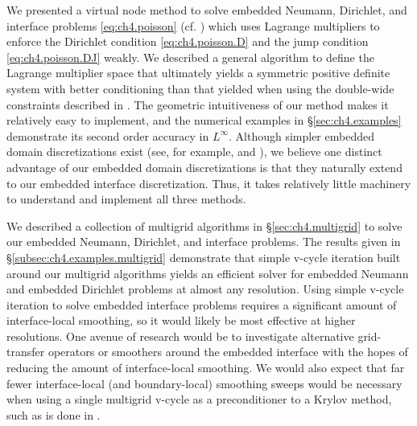 We presented a virtual node method to solve embedded Neumann, Dirichlet, and interface problems \eqref{eq:ch4.poisson} (cf. \cite{Bedrossian10}) which uses Lagrange multipliers to enforce the Dirichlet condition \eqref{eq:ch4.poisson.D} and the jump condition \eqref{eq:ch4.poisson.DJ} weakly. We described a general algorithm to define the Lagrange multiplier space that ultimately yields a symmetric positive definite system with better conditioning than that yielded when using the double-wide constraints described in \cite{Bedrossian10}. The geometric intuitiveness of our method makes it relatively easy to implement, and the numerical examples in \S\ref{sec:ch4.examples} demonstrate its second order accuracy in $L^{\infty}$. Although simpler embedded domain discretizations exist (see, for example, \cite{Gibou02} and \cite{Ng.YenTing09}), we believe one distinct advantage of our embedded domain discretizations is that they naturally extend to our embedded interface discretization. Thus, it takes relatively little machinery to understand and implement all three methods.

We described a collection of multigrid algorithms in \S\ref{sec:ch4.multigrid} to solve our embedded Neumann, Dirichlet, and interface problems. The results given in \S\ref{subsec:ch4.examples.multigrid} demonstrate that simple v-cycle iteration built around our multigrid algorithms yields an efficient solver for embedded Neumann and embedded Dirichlet problems at almost any resolution. Using simple v-cycle iteration to solve embedded interface problems requires a significant amount of interface-local smoothing, so it would likely be most effective at higher resolutions. One avenue of research would be to investigate alternative grid-transfer operators or smoothers around the embedded interface with the hopes of reducing the amount of interface-local smoothing. We would also expect that far fewer interface-local (and boundary-local) smoothing sweeps would be necessary when using a single multigrid v-cycle as a preconditioner to a Krylov method, such as is done in \cite{McAdams10}.
